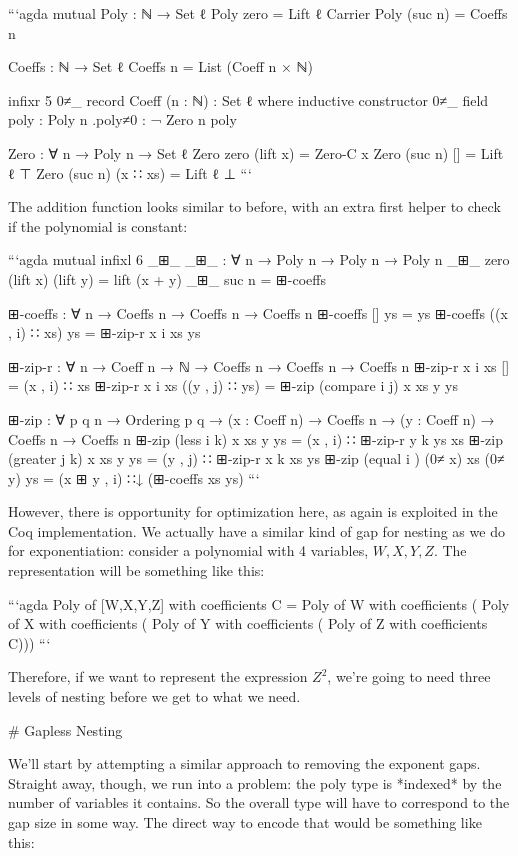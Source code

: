 \documentclass{article}
\begin{document}
```agda
mutual
  Poly : ℕ → Set ℓ
  Poly zero = Lift ℓ Carrier
  Poly (suc n) = Coeffs n

  Coeffs : ℕ → Set ℓ
  Coeffs n = List (Coeff n × ℕ)

  infixr 5 0≠_
  record Coeff (n : ℕ) : Set ℓ where
    inductive
    constructor 0≠_
    field
      poly : Poly n
      .{poly≠0} : ¬ Zero n poly

  Zero : ∀ n → Poly n → Set ℓ
  Zero zero (lift x) = Zero-C x
  Zero (suc n) [] = Lift ℓ ⊤
  Zero (suc n) (x ∷ xs) = Lift ℓ ⊥
```

The addition function looks similar to before, with an extra first helper to
check if the polynomial is constant:

```agda
mutual
  infixl 6 _⊞_
  _⊞_ : ∀ {n} → Poly n → Poly n → Poly n
  _⊞_ {zero} (lift x) (lift y) = lift (x + y)
  _⊞_ {suc n} = ⊞-coeffs

  ⊞-coeffs : ∀ {n} → Coeffs n → Coeffs n → Coeffs n
  ⊞-coeffs [] ys = ys
  ⊞-coeffs ((x , i) ∷ xs) ys = ⊞-zip-r x i xs ys

  ⊞-zip-r : ∀ {n} → Coeff n → ℕ → Coeffs n → Coeffs n → Coeffs n
  ⊞-zip-r x i xs [] = (x , i) ∷ xs
  ⊞-zip-r x i xs ((y , j) ∷ ys) = ⊞-zip (compare i j) x xs y ys

  ⊞-zip : ∀ {p q n}
        → Ordering p q
        → (x : Coeff n)
        → Coeffs n
        → (y : Coeff n)
        → Coeffs n
        → Coeffs n
  ⊞-zip (less    i k) x xs y ys = (x , i) ∷ ⊞-zip-r y k ys xs
  ⊞-zip (greater j k) x xs y ys = (y , j) ∷ ⊞-zip-r x k xs ys
  ⊞-zip (equal   i  ) (0≠ x) xs (0≠ y) ys =
    (x ⊞ y , i) ∷↓ (⊞-coeffs xs ys)
```

However, there is opportunity for optimization here, as again is exploited in
the Coq implementation. We actually have a similar kind of gap for nesting as we
do for exponentiation: consider a polynomial with 4 variables, $W, X, Y, Z$. The
representation will be something like this:

```agda
Poly of [W,X,Y,Z] with coefficients C = 
  Poly of W with coefficients (
    Poly of X with coefficients (
      Poly of Y with coefficients (
        Poly of Z with coefficients C)))
```

Therefore, if we want to represent the expression $Z^2$, we're going to need
three levels of nesting before we get to what we need.

# Gapless Nesting

We'll start by attempting a similar approach to removing the exponent gaps.
Straight away, though, we run into a problem: the poly type is *indexed* by the
number of variables it contains. So the overall type will have to correspond to
the gap size in some way. The direct way to encode that would be something like
this:
\end{document}
